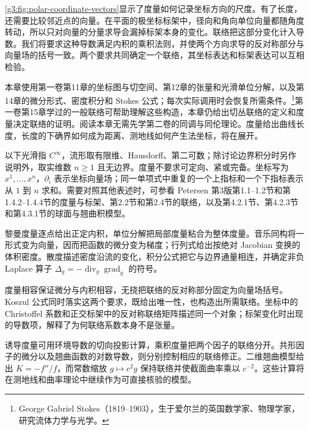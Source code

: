 \cref{g3:fig:polar-coordinate-vectors}显示了度量如何记录坐标方向的尺度。有了长度，还需要比较邻近点的向量。在平面的极坐标标架中，径向和角向单位向量都随角度转动，所以只对向量的分量求导会漏掉标架本身的变化。联络把这部分变化计入导数。我们将要求这种导数满足内积的乘积法则，并使两个方向求导的反对称部分与向量场的括号一致。两个要求共同确定一个联络，其坐标表达和标架表达可以互相检验。

\ProseParagraphBreak

本章使用第一卷第11章的坐标图与切空间、第12章的张量和光滑单位分解，以及第14章的微分形式、密度积分和 Stokes 公式；每次实际调用时会恢复所需条件。\footnote{George Gabriel Stokes（1819--1903），生于爱尔兰的英国数学家、物理学家，研究流体力学与光学。}第一卷第15章学过的一般联络可帮助理解这些构造，本章仍给出切丛联络的定义和度量决定联络的证明。阅读本章无需先学第二卷的同调与同伦理论。度量给出曲线长度，长度的下确界如何成为距离、测地线如何产生法坐标，将在展开。

\ProseParagraphBreak

以下光滑指 \(C^\infty\)，流形取有限维、Hausdorff、第二可数；除讨论边界积分时另作说明外，取实维数 \(n\ge1\) 且无边界。度量不要求可定向、紧或完备。坐标写为 \(x^1,\ldots,x^n\)，\(\partial_i\) 表示坐标向量场；同一单项式中重复的一个上指标和一个下指标表示从 \(1\) 到 \(n\) 求和。需要对照其他表述时，可参看 Petersen 第3版第1.1--1.2节和第1.4.2--1.4.4节的度量与标架、第2.2节和第2.4节的联络，以及第4.2.1节、第4.2.3节和第4.3.1节的球面与翘曲积模型\cite[第1.1--1.2节; 第1.4.2--1.4.4节; 第2.2节; 第2.4节; 第4.2.1节; 第4.2.3节; 第4.3.1节]{Petersen2016}。






\begin{chaptersummary}
	黎曼度量逐点给出正定内积，单位分解把局部度量粘合为整体度量。音乐同构将一形式变为向量，因而把函数的微分变为梯度；行列式给出按绝对 Jacobian 变换的体积密度。散度描述密度沿流的变化，积分公式把它与边界通量相连，并确定非负 Laplace 算子 \(\Delta_g=-\operatorname{div}_g\operatorname{grad}_g\) 的符号。

	\ProseParagraphBreak

	度量相容保证微分与内积相容，无挠把联络的反对称部分固定为向量场括号。Koszul 公式同时落实这两个要求，既给出唯一性，也构造出所需联络。坐标中的 Christoffel 系数和正交标架中的反对称联络矩阵描述同一个对象；标架变化时出现的导数项，解释了为何联络系数本身不是张量。

	\ProseParagraphBreak

	诱导度量可用环境导数的切向投影计算，乘积度量把两个因子的联络分开。共形因子的微分以及翘曲函数的对数导数，则分别控制相应的联络修正。二维翘曲模型给出 \(K=-f''/f\)，而常数缩放 \(g\mapsto c^2g\) 保持联络并使截面曲率乘以 \(c^{-2}\)。这些计算将在测地线和曲率理论中继续作为可直接核验的模型。
\end{chaptersummary}

